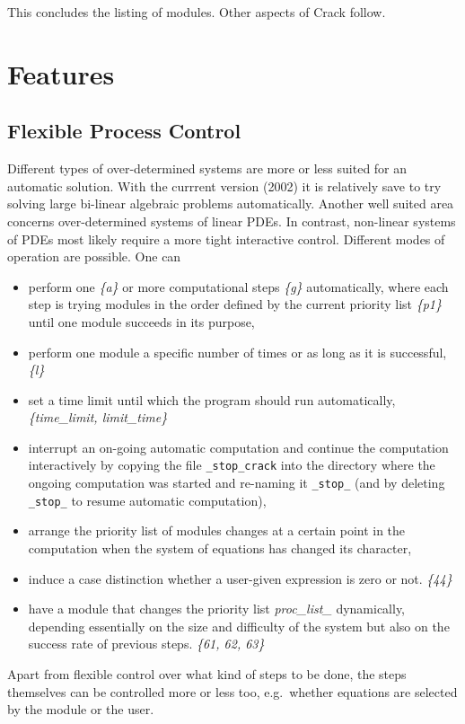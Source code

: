 \documentclass[12pt]{article}
\begin{document}
  This concludes the listing of modules. Other aspects of {\sc Crack} follow.

\section{Features}

\subsection{Flexible Process Control}
  Different types of over-determined systems are more or less suited
  for an automatic solution. With the currrent version (2002)
  it is relatively save to try solving large bi-linear algebraic problems
  automatically. Another well suited area concerns over-determined systems
  of linear PDEs. In contrast, non-linear systems of PDEs most likely
  require a more tight interactive control. Different modes of
  operation are possible. One can 
  \begin{itemize}
  \item perform one {\em\{a\}} or more computational steps {\em\{g\}} 
    automatically, where each step is trying modules in the order defined by the
    current priority list {\em \{p1\} } until one module succeeds in
    its purpose,
  \item 
    perform one module a specific number of times or as long as it is
    successful, {\em \{l\} }
  \item
    set a time limit until which the program should run automatically,
    {\em \{time\_limit, limit\_time\} } 
  \item 
    interrupt an on-going automatic computation and continue the
    computation interactively by copying the file
    {\tt \_stop\_crack} into the directory where the ongoing
    computation was started and re-naming it {\tt \_stop\_}
    (and by deleting {\tt \_stop\_} to resume automatic computation),
  \item  
    arrange the priority list of modules changes
    at a certain point in the computation when the system of equations
    has changed its character,
  \item 
    induce a case distinction whether a user-given expression 
    is zero or not. {\em \{44\} } 
  \item 
    have a module that changes the priority list {\em proc\_list\_}
    dynamically, depending essentially on the size and difficulty
    of the system but also on the success rate of previous steps. 
    {\em \{61, 62, 63\} }
  \end{itemize}
  Apart from flexible control over what kind of steps to be done, the
  steps themselves can be controlled more or less too, e.g.\ whether
  equations are selected by the module or the user.
\end{document}
